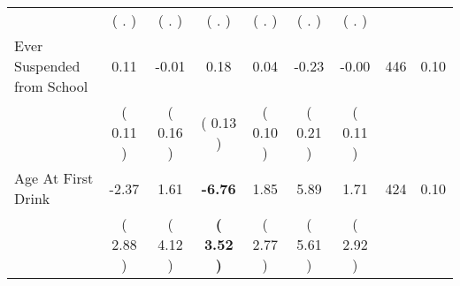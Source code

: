 \begin{tabular}{lcccccccc}
 & (        . ) & (        . ) & (        . ) & (        . ) & (        . ) & (        . ) & \\
Ever Suspended from School &      0.11 &     -0.01 &      0.18 &      0.04 &     -0.23 &     -0.00 & 446 &       0.10 \\ 
 & (     0.11 ) & (     0.16 ) & (     0.13 ) & (     0.10 ) & (     0.21 ) & (     0.11 ) & \\
Age At First Drink &     -2.37 &      1.61 & \textbf{    -6.76} &      1.85 &      5.89 &      1.71 & 424 &       0.10 \\ 
 & (     2.88 ) & (     4.12 ) & \textbf{(     3.52 )} & (     2.77 ) & (     5.61 ) & (     2.92 ) & \\
\bottomrule
\end{tabular}
